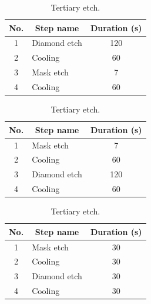 \begin{table}[H]
    \centering
    \renewcommand{\arraystretch}{1.2} %

    \begin{subtable}{\textwidth}
        \centering
        \footnotesize
        \begin{tabular}{|c|l|c|}
            \hline
            \bfseries No. & \multicolumn{1}{c|}{\bfseries Step name} & \bfseries Duration (s) \\
            \hline
            1 & Diamond etch & 120 \\
            2 & Cooling      & 60  \\
            3 & Mask etch    & 7   \\
            4 & Cooling      & 60  \\
            \hline
        \end{tabular}
        \caption{Standard etch.}
        \label{tab:exp1}
    \end{subtable}


    \begin{subtable}{\textwidth}
        \centering
        \footnotesize
        \begin{tabular}{|c|l|c|}
            \hline
            \bfseries No. & \multicolumn{1}{c|}{\bfseries Step name} & \bfseries Duration (s) \\
            \hline
            1 & Mask etch    & 7   \\
            2 & Cooling      & 60  \\
            3 & Diamond etch & 120 \\
            4 & Cooling      & 60  \\
            \hline
        \end{tabular}
        \caption{Secondary etch.}
        \label{tab:exp2}
    \end{subtable}


    \begin{subtable}{\textwidth}
        \centering
        \footnotesize
        \begin{tabular}{|c|l|c|}
            \hline
            \bfseries No. & \multicolumn{1}{c|}{\bfseries Step name} & \bfseries Duration (s) \\
            \hline
            1 & Mask etch    & 30 \\
            2 & Cooling      & 30 \\
            3 & Diamond etch & 30 \\
            4 & Cooling      & 30 \\
            \hline
        \end{tabular}
        \caption{Tertiary etch.}
        \label{tab:exp3}
    \end{subtable}


\end{table}
